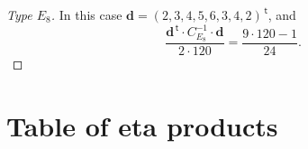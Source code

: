 \documentclass{article}
\theoremstyle{definition}
\renewcommand{\top}{\,\mathsf{t}}
\begin{document}
\begin{proof}[Type $E_8$]
	In this case $\mathbf{d}=(	2,3,4,5,6,3,4,2)^{\top}$, and
	\[ \frac{\mathbf{d}^{\top}\cdot C_{E_8}^{-1}\cdot \mathbf{d}}{2\cdot 120}=\frac{9\cdot 120-1}{24}. \]
	\begin{comment}
	\[ 
	\frac{1}{2\cdot 120}
	\begin{pmatrix}
	2 \\ 3 \\ 4 \\5  \\ 6 \\ 3 \\ 4 \\ 2
	\end{pmatrix}^{\top}
	\cdot
	\begin{pmatrix}
	2 & -1 & 0 & 0 & 0 & 0 & 0 & 0\\
	-1 & 2 & -1 & 0 & 0 & 0 & 0 & 0\\
	0 & -1 & 2 & -1 & 0 & 0 & 0 & 0 \\
	0 & 0 & -1 & 2 & -1 & 0 & 0 & 0 \\
	0 & 0 & 0 & -1 & 2 & -1 & -1 & 0 \\
	0 & 0 & 0 & 0 & -1 & 2 & 0 & 0 \\
	0 & 0 & 0 & 0  & -1 & 0 & 2 & -1 \\
	0 & 0 & 0 & 0 & 0  & 0 & -1 & 2
	\end{pmatrix}^{-1} 
	\cdot
	\begin{pmatrix}
	2 \\ 3 \\ 4 \\5  \\ 6 \\ 3 \\ 4 \\ 2
	\end{pmatrix}
	=\frac{9\cdot 120-1}{24}.
	\]
	\end{comment}
\end{proof}

\clearpage
\section{Table of eta products}
\label{app:tableeta}
\renewcommand{\arraystretch}{1.5}
\end{document}
